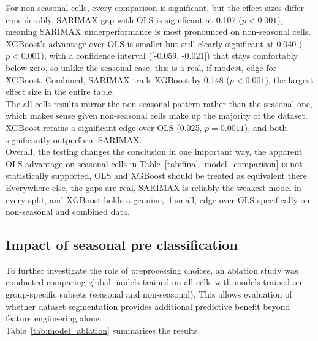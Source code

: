 For non-seasonal cells, every comparison is significant, but the effect sizes differ considerably. SARIMAX gap with OLS is significant at 0.107 ($p < 0.001$), meaning SARIMAX underperformance is most pronounced on non-seasonal cells. XGBoost's advantage over OLS is smaller but still clearly significant at 0.040 ($p < 0.001$), with a confidence interval ([-0.059, -0.021]) that stays comfortably below zero, so unlike the seasonal case, this is a real, if modest, edge for XGBoost. Combined, SARIMAX trails XGBoost by 0.148 ($p < 0.001$), the largest effect size in the entire table. \\

The all-cells results mirror the non-seasonal pattern rather than the seasonal one, which makes sense given non-seasonal cells make up the majority of the dataset. XGBoost retains a significant edge over OLS (0.025, $p = 0.0011$), and both significantly outperform SARIMAX. \\

Overall, the testing changes the conclusion in one important way, the apparent OLS advantage on seasonal cells in Table~\ref{tab:final_model_comparison} is not statistically supported, OLS and XGBoost should be treated as equivalent there. Everywhere else, the gaps are real, SARIMAX is reliably the weakest model in every split, and XGBoost holds a genuine, if small, edge over OLS specifically on non-seasonal and combined data. \\

\subsection{Impact of seasonal pre classification}

To further investigate the role of preprocessing choices, an ablation study was conducted comparing global models trained on all cells with models trained on group-specific subsets (seasonal and non-seasonal). This allows evaluation of whether dataset segmentation provides additional predictive benefit beyond feature engineering alone. \\

Table~\ref{tab:model_ablation} summarises the results.

